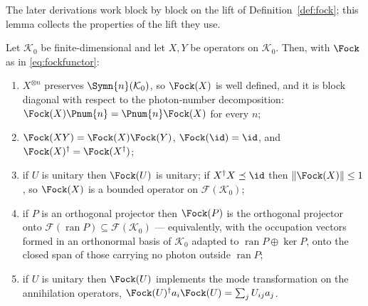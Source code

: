 
The later derivations work block by block on the lift of
Definition~\ref{def:fock}; this lemma collects the properties of the lift they
use.

\begin{lemma}\label{lem:fock-functor}
Let $\mathcal{K}_0$ be finite-dimensional and let $X,Y$ be operators on
$\mathcal{K}_0$. Then, with $\Fock$ as in \eqref{eq:fockfunctor}:
\begin{enumerate}[label=(\roman*),leftmargin=3.0em]
\item $X^{\otimes n}$ preserves $\Symn{n}(\mathcal{K}_0)$, so $\Fock(X)$ is
  well defined, and it is block diagonal with respect to the photon-number
  decomposition: $\Fock(X)\Pnum{n}=\Pnum{n}\Fock(X)$ for every $n$;
\item $\Fock(XY)=\Fock(X)\Fock(Y)$, $\Fock(\id)=\id$, and
  $\Fock(X)^\dagger=\Fock(X^\dagger)$;
\item if $U$ is unitary then $\Fock(U)$ is unitary; if
  $X^\dagger X\preceq\id$ then $\lVert\Fock(X)\rVert\le1$, so $\Fock(X)$ is a
  bounded operator on $\mathcal{F}(\mathcal{K}_0)$;
\item if $P$ is an orthogonal projector then $\Fock(P)$ is the orthogonal
  projector onto $\mathcal{F}(\operatorname{ran}P)\subseteq
  \mathcal{F}(\mathcal{K}_0)$ --- equivalently, with the occupation vectors
  formed in an orthonormal basis of $\mathcal{K}_0$ adapted to
  $\operatorname{ran}P\oplus\ker P$, onto the closed span of those carrying
  no photon outside $\operatorname{ran}P$;
\item if $U$ is unitary then $\Fock(U)$ implements the mode transformation on
  the annihilation operators,
  $\Fock(U)^\dagger a_i\Fock(U)=\sum_jU_{ij}a_j$.
\end{enumerate}
\end{lemma}

